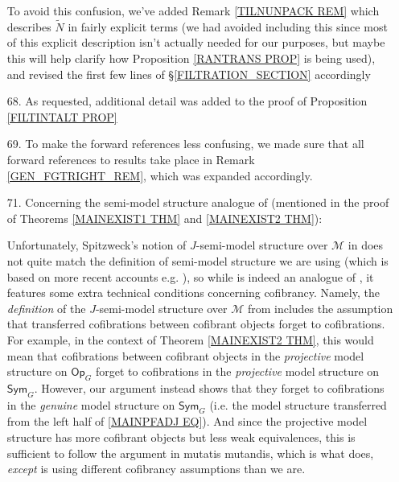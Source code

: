 \documentclass{article}
\begin{document}
\begin{itemize}
	To avoid this confusion,
	we've added Remark \ref{TILNUNPACK REM} 
	which describes $\tilde{N}$ in fairly explicit terms
	(we had avoided including this since most of this explicit description isn't actually needed for our purposes,
	but maybe this will help clarify how 
	Proposition \ref{RANTRANS PROP} is being used),
	and revised the first few lines of 
	\S \ref{FILTRATION_SECTION} accordingly	

	
	\item[68.] As requested, additional detail was added to the proof of
	Proposition \ref{FILTINTALT PROP}

	\item[69.]
	To make the forward references less confusing, 
	we made sure that all forward references to results take place in
	Remark \ref{GEN_FGTRIGHT_REM},
	which was expanded accordingly.

	\item[71.] 
	Concerning the semi-model structure analogue of
	\cite[Thm. 11.3.2]{Hi03}
	(mentioned in the proof of Theorems \ref{MAINEXIST1 THM} and \ref{MAINEXIST2 THM}):
	
	Unfortunately, Spitzweck's notion
	of $J$-semi-model structure over $\mathcal M$ in \cite{Spi01}
	does not quite match the definition
	of semi-model structure
	we are using
	(which is based on more recent accounts e.g. \cite{Fre09,WY18}),
	so while \cite[Thm. 2]{Spi01}
	is indeed an analogue of \cite[Thm. 11.3.2]{Hi03},
	it features some extra technical conditions concerning cofibrancy.
	Namely, the \emph{definition} of the $J$-semi-model structure over $\mathcal M$ from \cite{Spi01}
	includes the assumption
	that transferred cofibrations between cofibrant objects forget to cofibrations.
	For example,
	in the context of Theorem \ref{MAINEXIST2 THM},
	this would mean that cofibrations between cofibrant objects in the \emph{projective} 
	model structure on $\mathsf{Op}_G$
	forget to cofibrations in the 
	\emph{projective} 
	model structure on $\mathsf{Sym}_G$.
	However, our argument instead shows that they forget to 
	cofibrations in the \emph{genuine} 
	model structure on $\mathsf{Sym}_G$
	(i.e. the model structure transferred from the left half of \eqref{MAINPFADJ EQ}).
	And since the projective model structure has more cofibrant objects but less weak equivalences, 
	this is sufficient to follow the argument in 
	\cite[Thm. 11.3.2]{Hi03} mutatis mutandis,
	which is what \cite[Thm. 2]{Spi01} does,
	\emph{except} \cite[Thm. 2]{Spi01}
	is using different cofibrancy assumptions than we are.


\end{itemize}
\end{document}
